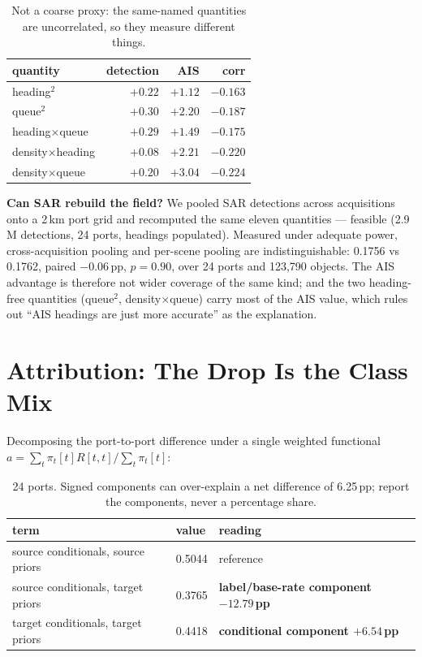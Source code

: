 \documentclass[journal]{IEEEtran}
\begin{document}
\begin{table}[t]
\caption{Not a coarse proxy: the same-named quantities are uncorrelated, so they measure different
things.}
\label{tab:perquantity}
\centering
\footnotesize
\begin{tabular}{@{}L{3.2cm}rrr@{}}
\toprule
quantity & detection & AIS & corr \\
\midrule
heading$^2$ & $+0.22$ & $+1.12$ & $-0.163$ \\
queue$^2$ & $+0.30$ & $+2.20$ & $-0.187$ \\
heading$\times$queue & $+0.29$ & $+1.49$ & $-0.175$ \\
density$\times$heading & $+0.08$ & $+2.21$ & $-0.220$ \\
density$\times$queue & $+0.20$ & $+3.04$ & $-0.224$ \\
\bottomrule
\end{tabular}
\end{table}

\textbf{Can SAR rebuild the field?} We pooled SAR detections across acquisitions onto a 2\,km port grid
and recomputed the same eleven quantities --- feasible (2.9\,M detections, 24 ports, headings
populated). Measured under adequate power, cross-acquisition pooling and per-scene pooling are
indistinguishable: 0.1756 vs 0.1762, paired $-0.06$\,pp, $p = 0.90$, over 24 ports and 123{,}790
objects. The AIS advantage is therefore not wider coverage of the same kind; and the two heading-free
quantities (\mbox{queue$^2$}, \mbox{density$\times$queue}) carry most of the AIS value, which rules out
``AIS headings are just more accurate'' as the explanation.

\section{Attribution: The Drop Is the Class Mix}
\label{sec:attrib}

Decomposing the port-to-port difference under a single weighted functional
$a = \sum_t \pi_t[t] R[t,t] / \sum_t \pi_t[t]$:

\begin{table}[t]
\caption{24 ports. Signed components can over-explain a net difference of 6.25\,pp; report the
components, never a percentage share.}
\label{tab:attrib}
\centering
\footnotesize
\begin{tabular}{@{}L{3.4cm}L{1.1cm}L{2.6cm}@{}}
\toprule
term & value & reading \\
\midrule
source conditionals, source priors & 0.5044 & reference \\
source conditionals, target priors & 0.3765 & \textbf{label/base-rate component $-12.79$\,pp} \\
target conditionals, target priors & 0.4418 & \textbf{conditional component $+6.54$\,pp} \\
\bottomrule
\end{tabular}
\end{table}
\end{document}
